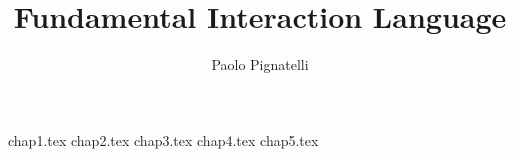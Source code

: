 \documentclass{book}
\begin{document}
\title{Fundamental Interaction Language}
\author{Paolo Pignatelli}
\maketitle

{chap1.tex}
{chap2.tex}   %
{chap3.tex}     %
{chap4.tex}   %
{chap5.tex}   %
\end{document}
